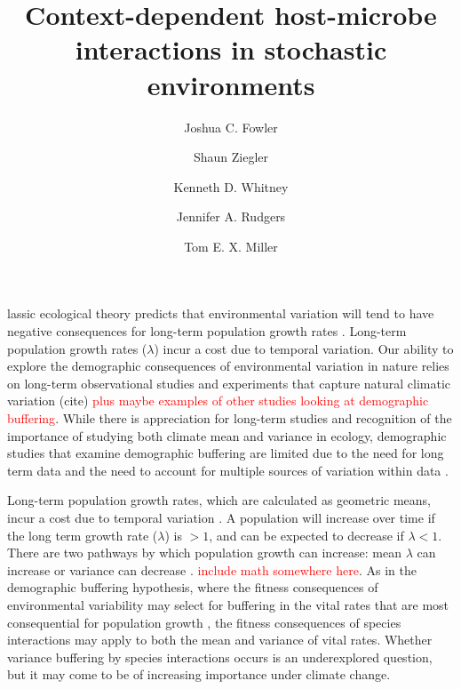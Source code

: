 \documentclass[9pt,twocolumn,twoside,lineno]{pnas-new}
\title{Context-dependent host-microbe interactions in stochastic environments}
\author[a,1]{Joshua C. Fowler}
\author[b]{Shaun Ziegler}
\author[b]{Kenneth D. Whitney}
\author[b]{Jennifer A. Rudgers}
\author[a]{Tom E. X. Miller}
\affil[a]{Rice University, Department of BioSciences, Houston, TX, 77005}
\affil[b]{University of New Mexico, Department of Biology, Albuquerque, NM, 87131}
\begin{document}


\maketitle
\thispagestyle{firststyle}

lassic ecological theory predicts that environmental variation will tend to have negative consequences for long-term population growth rates \cite{lewontin_population_1969,tuljapurkar_population_1982}. Long-term population growth rates ($\lambda$) incur a cost due to temporal variation. Our ability to explore the demographic consequences of environmental variation in nature relies on long-term observational studies and experiments that capture natural climatic variation (cite) \textcolor{red}{plus maybe examples of other studies looking at demographic buffering}. While there is appreciation for long-term studies and recognition of the importance of studying both climate mean and variance in ecology, demographic studies that examine demographic buffering are limited due to the need for long term data and the need to account for multiple sources of variation within data \cite{hilde_demographic_2020}.

Long-term population growth rates, which are calculated as geometric means, incur a cost due to temporal variation \cite{lewontin_population_1969,tuljapurkar_population_1982}. A population will increase over time if the long term growth rate ($\lambda$) is $>1$, and can be expected to decrease if $ \lambda<1$. There are two pathways by which population growth can increase: mean $\lambda$ can increase or variance can decrease \cite{}. \textcolor{red}{include math somewhere here}. As in the demographic buffering hypothesis, where the fitness consequences of environmental variability may select for buffering in the vital rates that are most consequential for population growth \cite{pfister1998patterns}, the fitness consequences of species interactions may apply to both the mean and variance of vital rates. Whether variance buffering by species interactions occurs is an underexplored question, but it may come to be of increasing importance under climate change.
\end{document}

